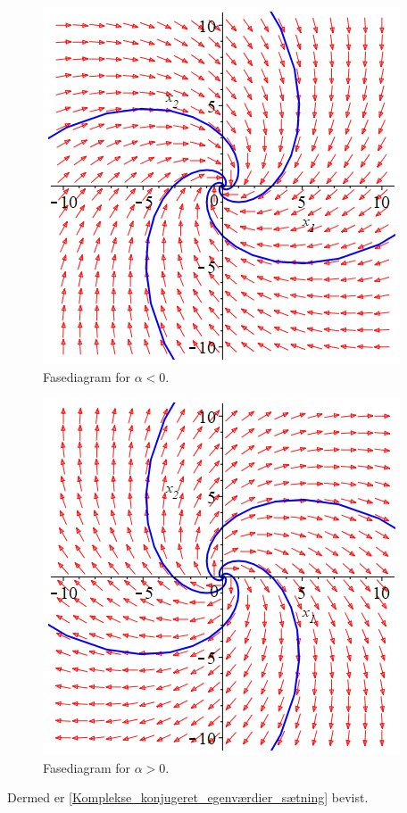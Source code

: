 \begin{bev}
\begin{itemize}
   \begin{minipage}{0.4\textwidth}
   \begin{figure}[H]
       \centering
       \captionsetup{justification=centering}
       \includegraphics[scale=0.4]{Billeder/spiral_alpha_leq_0.png}
       \caption{Fasediagram for $\alpha<0$.}
       \label{fig:fase_komplekse_egenværdier_alpha_leq_0}
   \end{figure}
   \end{minipage}
   \hfill
   \begin{minipage}{0.4\textwidth}
   \begin{figure}[H]
       \centering
       \captionsetup{justification=centering}
       \includegraphics[scale=0.4]{Billeder/spiral_alpha_geq_0.png}
       \caption{Fasediagram for $\alpha>0$.}
       \label{fig:fase_komplekse_egenværdier_alpha_geq_0}
   \end{figure}
   \end{minipage}
\end{itemize}
Dermed er \autoref{Komplekse_konjugeret_egenværdier_sætning} bevist.
\end{bev}